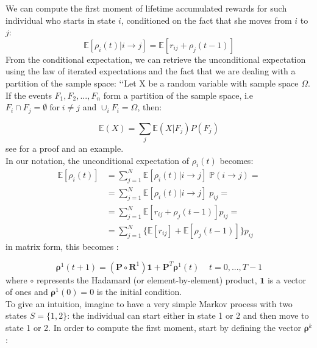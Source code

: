 \documentclass[\main/main.tex]{subfiles}
\begin{document}
We can compute the first moment of lifetime accumulated rewards for such individual who starts in state $i$, conditioned on the fact that she moves from $i$ to $j$:
    \begin{equation}
        \mathds{E}[ \rho_i(t) | i \rightarrow j] = \mathds{E}[ r_{ij} + \rho_j(t-1) ]
    \end{equation}
From the conditional expectation, we can retrieve the unconditional expectation using the law of iterated expectations and the fact that we are dealing with a partition of the sample space: \lq\lq Let X be a random variable with sample space $\Omega$. If the events $F_1, F_2, ..., F_n$ form a partition of the sample space, i.e $F_i \cap F_j = \emptyset \; \text{for} \; i \neq j$ and $\cup_i F_i = \Omega$, then:

\begin{equation}
\mathds{E} (X) = \sum_j \mathds{E}(X | F_j) P(F_j)
\end{equation}
see \cite{Grinstead1997} for a proof and an example.\\



\noindent In our notation, the unconditional expectation of $ \rho_i(t) $ becomes:
    \begin{equation}\label{unconditional}
    \begin{split}
         \mathds{E}[ \rho_i(t)] &= \sum_{j=1}^N \mathds{E}[\rho_i(t) | i \rightarrow j] \; \mathds{P}( i \rightarrow j) = \\
         &= \sum_{j=1}^N  \mathds{E}[\rho_i(t) | i \rightarrow j]\; p_{ij} =\\
         &= \sum_{j=1}^N    \mathds{E}[ r_{ij} + \rho_j(t-1)]  p_{ij} = \\
         &= \sum_{j=1}^N  \{  \mathds{E}[ r_{ij}] + \mathds{E}[\rho_j(t-1)]\}  p_{ij}
    \end{split}
    \end{equation}
in matrix form, this becomes \citep{Caswell2011}:

\begin{equation}
        \bm{\rho}^1(t+1) = (\mathbf{P} \circ \mathbf{R}^1) \mathbf{1} + \mathbf{P}^T \bm{\rho}^1(t) \;\;\;\; t=0,..., T-1
\end{equation}
where $\circ$ represents the Hadamard (or element-by-element) product, $\mathbf{1}$ is a vector of ones and $\bm{\rho}^1(0) = 0$ is the initial condition.\\

To give an intuition, imagine to have a very simple Markov process with two states $S=\{1,2\}$: the individual can start either in state 1 or 2 and then move to state 1 or 2. In order to compute the first moment, start by defining the vector $ \bm{\rho}^{k}$:
\end{document}
